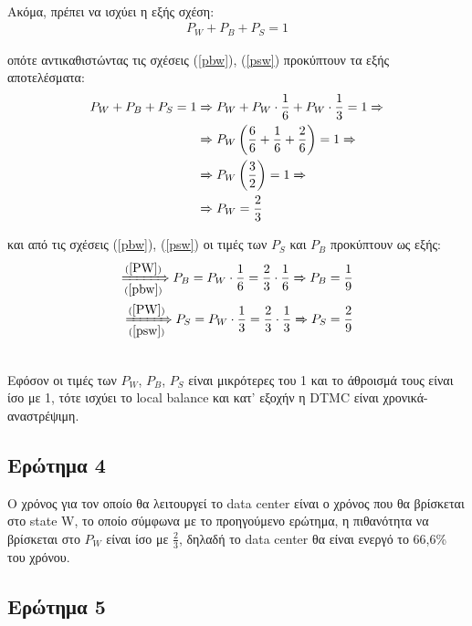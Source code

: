 \noindent\\
Ακόμα, πρέπει να ισχύει η εξής σχέση:
\begin{align*}
	P_W + P_B + P_S = 1
\end{align*}

οπότε αντικαθιστώντας τις σχέσεις (\ref{pbw}), (\ref{psw}) προκύπτουν τα εξής αποτελέσματα:
\begin{align}
	P_W + P_B + P_S = 1 &\xRightarrow{} P_W + P_W \cdot \frac{1}{6} + P_W \cdot \frac{1}{3} = 1 \notag \xRightarrow{}\\
						&\xRightarrow{} P_W \left( \frac{6}{6} + \frac{1}{6} +  \frac{2}{6} \right) = 1 \notag \xRightarrow{}\\
						&\xRightarrow{} P_W \left( \frac{3}{2} \right) = 1 \notag \xRightarrow{}\\
						&\xRightarrow{} P_W = \frac{2}{3} \label{PW}
\end{align}

και από τις σχέσεις (\ref{pbw}), (\ref{psw}) οι τιμές των $P_S$ και $P_B$ προκύπτουν ως εξής:
\begin{align}
	\xRightarrow[(\ref{pbw})]{(\ref{PW})} P_B = P_W \cdot \frac{1}{6} = \frac{2}{3} \cdot \frac{1}{6} \xRightarrow{} P_B = \frac{1}{9}\\
	\xRightarrow[(\ref{psw})]{(\ref{PW})} P_S = P_W \cdot \frac{1}{3} = \frac{2}{3} \cdot \frac{1}{3} \xRightarrow{} P_S = \frac{2}{9}
\end{align}


\noindent\\
Εφόσον οι τιμές των $P_W$, $P_B$, $P_S$ είναι μικρότερες του 1 και το άθροισμά τους είναι ίσο με 1, τότε ισχύει το local balance και κατ' εξοχήν η DTMC είναι χρονικά-αναστρέψιμη.

\subsection*{Ερώτημα 4}
\label{ex2q4}

Ο χρόνος για τον οποίο θα λειτουργεί το data center είναι ο χρόνος που θα βρίσκεται στο state W, το οποίο σύμφωνα με το προηγούμενο ερώτημα, η πιθανότητα να βρίσκεται στο $P_W$ είναι ίσο με $\frac{2}{3}$, δηλαδή το data center θα είναι ενεργό το 66,6\% του χρόνου.

\subsection*{Ερώτημα 5}
\label{ex2q5}

